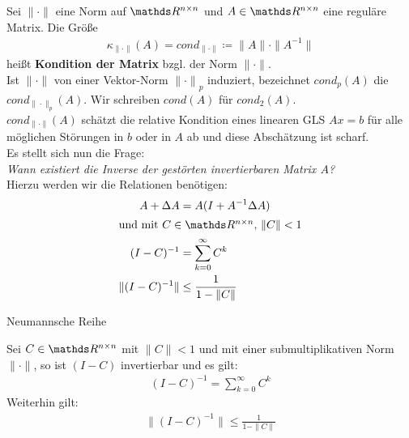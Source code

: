 \begin{Defe}
  Sei $\|\cdot\|$ eine Norm auf $\R^{n\times n} $ und $A\in \R^{n\times n}$ eine reguläre Matrix.
  Die Größe
  \begin{gather*}
    \kappa_{\|\cdot\|}(A) = cond_{\|\cdot\|} \coloneqq \|A\| \cdot \|A^{-1}\|
  \end{gather*}
  heißt \textbf{Kondition der Matrix} bzgl. der Norm ${\|\cdot\|}$. \\
  Ist  ${\|\cdot\|}$ von einer Vektor-Norm ${\|\cdot\|}_p$ induziert, bezeichnet 
  $cond_p(A)$
  die $cond_{\|\cdot\|_p}(A)$. Wir schreiben $cond(A)$ für $cond_2(A)$. \\
  $cond_{\|\cdot\|}(A) $ schätzt die relative Kondition eines linearen GLS $Ax=b$ für alle möglichen 
  Störungen in $b$ oder in $A$ ab und diese Abschätzung ist scharf. \\
  
  Es stellt sich nun die Frage: \\
  \textit{Wann existiert die Inverse der gestörten invertierbaren Matrix $A$?} \\
  Hierzu werden wir die Relationen benötigen:
  \begin{align*}
    A+\Delta A &= A (I+A^{-1}\Delta A)\\
    \intertext{und mit $C \in \Renn,\, \|C\| < 1$}
    (I-C)^{-1} &= \sum_{k=0}^{\infty}C^k \\
    \|	(I-C)^{-1} \| &\leq \frac{1}{1-\|C\|}
  \end{align*}
\end{Defe}


\begin{Leme}{Neumannsche Reihe}
  \label{3.2.12}
  \addtocounter{equation}{1}
  Sei $C\in\Renn$ mit $\|C\|<1$ und mit einer submultiplikativen Norm $\|\cdot\|$,
  so ist $(I-C)$ invertierbar und es gilt:
  \begin{gather*}
    (I-C)^{-1}=\sum_{k=0}^{\infty}C^k
  \end{gather*}
  Weiterhin gilt:
  \begin{gather*}
    \|(I-C)^ {-1}\| \leq \frac{1}{1-\|C\|}
  \end{gather*}
\end{Leme}

